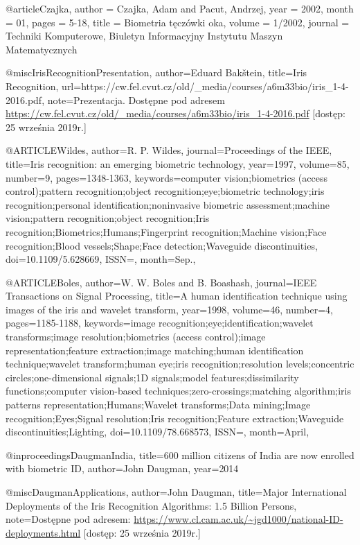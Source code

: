 \documentclass[10pt,polish,a4paper,oneside]{ppfcmthesis}
\begin{document}
{@article{Czajka,
author = {Czajka, Adam and Pacut, Andrzej},
year = {2002},
month = {01},
pages = {5-18},
title = {Biometria tęczówki oka},
volume = {1/2002},
journal = {Techniki Komputerowe, Biuletyn Informacyjny Instytutu Maszyn Matematycznych}
}

@misc{IrisRecognitionPresentation,
  author={Eduard Bakštein},
  title={Iris Recognition},
  url={https://cw.fel.cvut.cz/old/_media/courses/a6m33bio/iris_1-4-2016.pdf},
  note={Prezentacja. Dostępne pod adresem \url{https://cw.fel.cvut.cz/old/_media/courses/a6m33bio/iris_1-4-2016.pdf} [dostęp: 25 września 2019r.]}
}

@ARTICLE{Wildes,
author={R. P. {Wildes}},
journal={Proceedings of the IEEE},
title={Iris recognition: an emerging biometric technology},
year={1997},
volume={85},
number={9},
pages={1348-1363},
keywords={computer vision;biometrics (access control);pattern recognition;object recognition;eye;biometric technology;iris recognition;personal identification;noninvasive biometric assessment;machine vision;pattern recognition;object recognition;Iris recognition;Biometrics;Humans;Fingerprint recognition;Machine vision;Face recognition;Blood vessels;Shape;Face detection;Waveguide discontinuities},
doi={10.1109/5.628669},
ISSN={},
month={Sep.},}

@ARTICLE{Boles,
author={W. W. {Boles} and B. {Boashash}},
journal={IEEE Transactions on Signal Processing},
title={A human identification technique using images of the iris and wavelet transform},
year={1998},
volume={46},
number={4},
pages={1185-1188},
keywords={image recognition;eye;identification;wavelet transforms;image resolution;biometrics (access control);image representation;feature extraction;image matching;human identification technique;wavelet transform;human eye;iris recognition;resolution levels;concentric circles;one-dimensional signals;1D signals;model features;dissimilarity functions;computer vision-based techniques;zero-crossings;matching algorithm;iris patterns representation;Humans;Wavelet transforms;Data mining;Image recognition;Eyes;Signal resolution;Iris recognition;Feature extraction;Waveguide discontinuities;Lighting},
doi={10.1109/78.668573},
ISSN={},
month={April},}

@inproceedings{DaugmanIndia,
  title={600 million citizens of India are now enrolled with biometric ID},
  author={John Daugman},
  year={2014}
}

@misc{DaugmanApplications,
  author={John Daugman},
  title={Major International Deployments of the Iris Recognition Algorithms: 1.5 Billion Persons},
  note={Dostępne pod adresem: \url{https://www.cl.cam.ac.uk/~jgd1000/national-ID-deployments.html} [dostęp: 25 września 2019r.]}
}

 }
\end{document}
